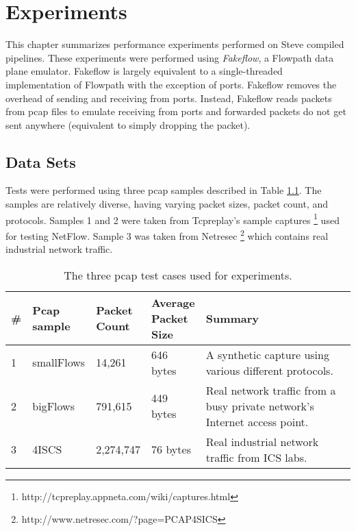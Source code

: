 \chapter{Experiments} \label{ch:experiments}

This chapter summarizes performance experiments performed on Steve compiled pipelines. These experiments were performed using \textit{Fakeflow}, a Flowpath data plane emulator. Fakeflow is largely equivalent to a single-threaded implementation of Flowpath with the exception of ports. Fakeflow removes the overhead of sending and receiving from ports. Instead, Fakeflow reads packets from pcap files to emulate receiving from ports and forwarded packets do not get sent anywhere (equivalent to simply dropping the packet).

\section{Data Sets} \label{exp:use_cases}

Tests were performed using three pcap samples described in Table \ref{tbl:pcap}. 
The samples are relatively diverse, having varying packet sizes, packet count, and protocols. Samples 1 and 2 were taken from Tcpreplay's sample captures \footnote{http://tcpreplay.appneta.com/wiki/captures.html} used for testing NetFlow. Sample 3 was taken from Netresec \footnote{http://www.netresec.com/?page=PCAP4SICS} which contains real industrial network traffic.

\begin{table}
\caption{The three pcap test cases used for experiments.}
\begin{center}
\begin{tabular}{| p{0.05\linewidth} || p{0.15\linewidth} | p{0.15\linewidth} | p{0.15\linewidth} | p{0.50\linewidth} |}
\hline
\# & Pcap sample & Packet Count & Average Packet Size & Summary \\
\hline
1 & smallFlows & 14,261 & 646 bytes & A synthetic capture using various different protocols. \\
\hline
2 & bigFlows & 791,615 & 449 bytes & Real network traffic from a busy private network's Internet access point. \\
\hline
3 & 4ISCS & 2,274,747 & 76 bytes & Real industrial network traffic from ICS labs. \\
\hline
\end{tabular}
\end{center}
\label{tbl:pcap}
\end{table}



